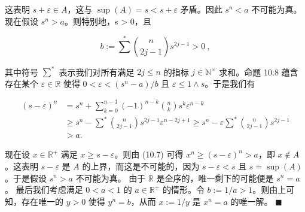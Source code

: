 \begin{proposition}
\begin{items}
这表明 $ s + \varepsilon \in A $，这与 $ \sup(A) = s < s + \varepsilon $ 矛盾。因此 $ s^n < a $ 不可能为真。
现在假设 $ s^{n} > a $。则特别地，s > 0，且

\[
b:=\sum^{*}\binom{n}{2j-1}s^{2j-1}>0~,
\]

其中符号 $ \sum^* $ 表示我们对所有满足 $ 2j \leq n $ 的指标 $ j \in \mathbb{N}^\times $ 求和。命题 10.8 蕴含存在某个 $ \varepsilon \in \mathbb{R} $ 使得 $ 0 < \varepsilon < (s^n - a)/b $ 且 $ \varepsilon \leq 1 \wedge s $。于是我们有

\begin{equation}
\begin{aligned}
(s-\varepsilon)^{n}&=s^{n}+\sum_{k=0}^{n-1}(-1)^{n-k}\binom{n}{k}s^{k}\varepsilon^{n-k}\\&\geq s^{n}-\sum^{*}\binom{n}{2j-1}s^{2j-1}\varepsilon^{n-2j+1}\geq s^{n}-\varepsilon\sum^{*}\binom{n}{2j-1}s^{2j-1}\\&>a.
\end{aligned}
\end{equation}

现在设 $ x \in \mathbb{R}^+ $ 满足 $ x \geq s - \varepsilon $。则由 (10.7) 可得 $ x^n \geq (s - \varepsilon)^n > a $，即 $ x \notin A $。这表明 $ s - \varepsilon $ 是 $ A $ 的上界，而这是不可能的，因为 $ s - \varepsilon < s $ 且 $ s = \sup(A) $。于是假设 $ s^n > a $ 不可能为真。
由于 $ \mathbb{R} $ 是全序的，唯一剩下的可能便是 $ s^{n}=a $。
最后我们考虑满足 $ 0 < a < 1 $ 的 $ a \in \mathbb{R}^+ $ 的情形。令 $ b := 1/a > 1 $。则由上可知，存在唯一的 $ y > 0 $ 使得 $ y^n = b $，从而 $ x := 1/y $ 是 $ x^n = a $ 的唯一解。 $ \blacksquare $

\end{items}

\end{proposition}

